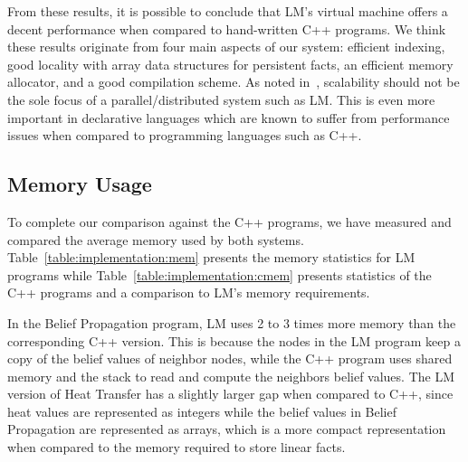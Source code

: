 From these results, it is possible to conclude that LM's virtual machine offers
a decent performance when compared to hand-written C++ programs. We think these
results originate from four main aspects of our system: efficient indexing, good
locality with array data structures for persistent facts, an efficient memory
allocator, and a good compilation scheme. As noted in~\cite{cost}, scalability
should not be the sole focus of a parallel/distributed system such as LM. This
is even more important in declarative languages which are known to suffer from
performance issues when compared to programming languages such as C++.

\subsection{Memory Usage}

To complete our comparison against the C++ programs, we have measured and
compared the average memory used by both systems.
Table~\ref{table:implementation:mem} presents the memory statistics for LM
programs while Table~\ref{table:implementation:cmem} presents statistics of the
C++ programs and a comparison to LM's memory requirements.

In the Belief Propagation program, LM uses 2 to 3 times more memory than the
corresponding C++ version. This is because the nodes in the LM program keep a
copy of the belief values of neighbor nodes, while the C++ program uses shared
memory and the stack to read and compute the neighbors belief values. The LM
version of Heat Transfer has a slightly larger gap when compared to C++, since
heat values are represented as integers while the belief values in Belief
Propagation are represented as arrays, which is a more compact representation
when compared to the memory required to store linear facts.

\begin{table}[ht]
   \begin{center}
      
   \end{center}


   \label{table:implementation:mem}
\end{table}

